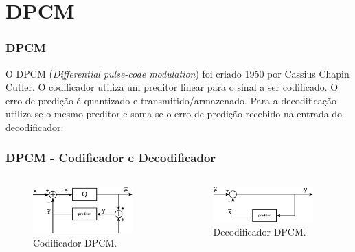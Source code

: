 \section{DPCM}


\begin{frame}%
  \frametitle{DPCM}
  O DPCM (\textit{Differential pulse-code modulation}) foi criado 1950 por Cassius Chapin Cutler.
  O codificador utiliza um preditor linear para o sinal a ser codificado. O erro de predição é quantizado e transmitido/armazenado.
  Para a decodificação utiliza-se o mesmo preditor e soma-se o erro de predição recebido na entrada do decodificador.
\end{frame}

\begin{frame}%
  \frametitle{DPCM - Codificador e Decodificador}
  \begin{columns}[c]
  \begin{figure}[h!]
  \centering
  \includegraphics[width=0.9\textwidth]{images/dpcm_codificador.pdf}
  \caption{Codificador DPCM.}
  \label{fig:dpcm_enc}
  \end{figure}
  \begin{figure}[h!]
  \centering
  \includegraphics[width=0.9\textwidth]{images/dpcm_decodificador.pdf}
  \caption{Decodificador DPCM.}
  \label{fig:dpcm_denc}
  \end{figure}
  \end{columns}

\end{frame}


